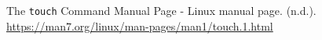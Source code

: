 \begin{thebibliography}{9}
    The \lstinline{touch} Command Manual Page - Linux manual page. (n.d.). \href{https://man7.org/linux/man-pages/man1/touch.1.html}{https://man7.org/linux/man-pages/man1/touch.1.html}
\end{thebibliography}